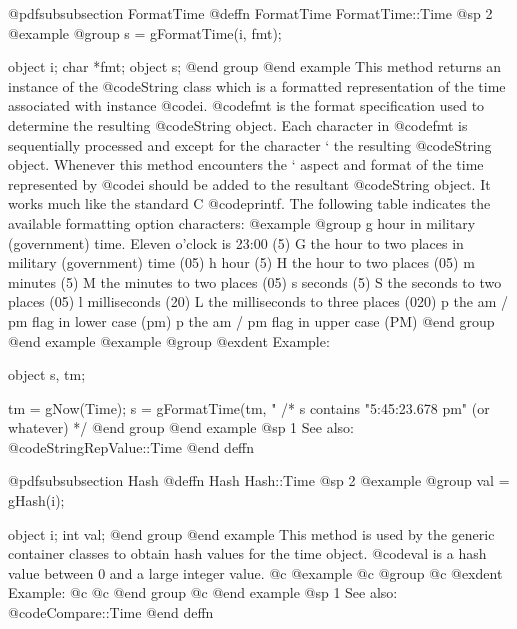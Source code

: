 @pdfsubsubsection {FormatTime}
@deffn {FormatTime} FormatTime::Time
@sp 2
@example
@group
s = gFormatTime(i, fmt);

object  i;
char    *fmt;
object  s;
@end group
@end example
This method returns an instance of the @code{String} class which is a
formatted representation of the time associated with instance @code{i}.
@code{fmt} is the format specification used to determine the resulting
@code{String} object.  Each character in @code{fmt} is sequentially
processed and except for the character `%
the resulting @code{String} object.  Whenever this method encounters
the `%
aspect and format of the time represented by @code{i} should be added to
the resultant @code{String} object.  It works much like the standard C
@code{printf}.  The following table indicates the available formatting option
characters:
@example
@group
g       hour in military (government) time.
        Eleven o'clock is 23:00 (5)
G       the hour to two places in military (government)
        time (05)
h       hour (5)
H       the hour to two places (05)
m       minutes (5)
M       the minutes to two places (05)
s       seconds (5)
S       the seconds to two places (05)
l       milliseconds (20)
L       the milliseconds to three places (020)
p       the am / pm flag in lower case (pm)
p       the am / pm flag in upper case (PM)
@end group
@end example
@example
@group
@exdent Example:

object  s, tm;

tm = gNow(Time);
s = gFormatTime(tm, "%
/*  s contains "5:45:23.678 pm" (or whatever)  */
@end group
@end example
@sp 1
See also:  @code{StringRepValue::Time}
@end deffn










@pdfsubsubsection {Hash}
@deffn {Hash} Hash::Time
@sp 2
@example
@group
val = gHash(i);

object  i;
int     val;
@end group
@end example
This method is used by the generic container classes to obtain hash values
for the time object.  @code{val} is a hash value between 0 and a large
integer value.
@c @example
@c @group
@c @exdent Example:
@c
@c @end group
@c @end example
@sp 1
See also:  @code{Compare::Time}
@end deffn











